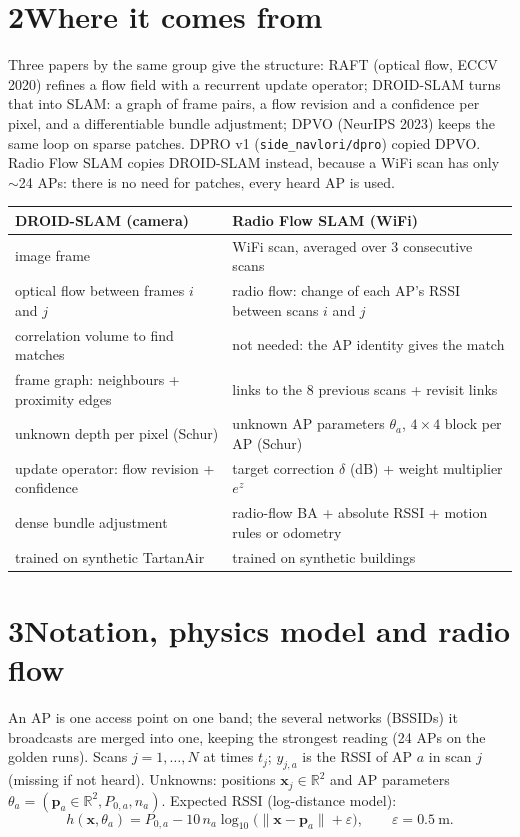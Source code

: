 \documentclass[11pt]{article}
\newcommand{\x}{\mathbf{x}}
\newcommand{\p}{\mathbf{p}}
\begin{document}
\section*{2\quad Where it comes from}
Three papers by the same group give the structure: RAFT (optical flow, ECCV 2020) refines a flow field with
a recurrent update operator; DROID-SLAM turns that into SLAM: a graph of frame pairs, a flow revision and a
confidence per pixel, and a differentiable bundle adjustment; DPVO (NeurIPS 2023) keeps the same loop on
sparse patches. DPRO v1 (\texttt{side\_navlori/dpro}) copied DPVO. Radio Flow SLAM copies DROID-SLAM instead,
because a WiFi scan has only $\sim$24 APs: there is no need for patches, every heard AP is used.
\begin{center}\small
\begin{tabular}{@{}ll@{}}
\toprule
DROID-SLAM (camera) & Radio Flow SLAM (WiFi) \\
\midrule
image frame & WiFi scan, averaged over 3 consecutive scans \\
optical flow between frames $i$ and $j$ & radio flow: change of each AP's RSSI between scans $i$ and $j$ \\
correlation volume to find matches & not needed: the AP identity gives the match \\
frame graph: neighbours + proximity edges & links to the 8 previous scans + revisit links \\
unknown depth per pixel (Schur) & unknown AP parameters $\theta_a$, $4\times4$ block per AP (Schur) \\
update operator: flow revision + confidence & target correction $\delta$ (dB) + weight multiplier $e^{z}$ \\
dense bundle adjustment & radio-flow BA + absolute RSSI + motion rules or odometry \\
trained on synthetic TartanAir & trained on synthetic buildings \\
\bottomrule
\end{tabular}
\end{center}

\section*{3\quad Notation, physics model and radio flow}
An AP is one access point on one band; the several networks (BSSIDs) it broadcasts are merged into one,
keeping the strongest reading (24 APs on the golden runs). Scans $j=1,\dots,N$ at times $t_j$; $y_{j,a}$ is
the RSSI of AP $a$ in scan $j$ (missing if not heard). Unknowns: positions $\x_j\in\mathbb{R}^2$ and AP
parameters $\theta_a=(\p_a\in\mathbb{R}^2,P_{0,a},n_a)$. Expected RSSI (log-distance model):
\begin{equation}
h(\x,\theta_a)=P_{0,a}-10\,n_a\log_{10}\!\big(\lVert\x-\p_a\rVert+\varepsilon\big),\qquad\varepsilon=0.5\ \text{m}.
\end{equation}
\end{document}
